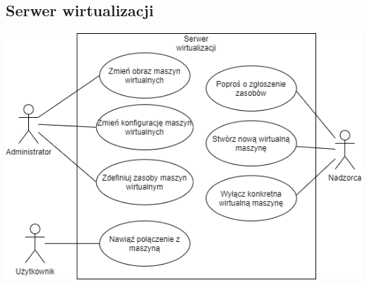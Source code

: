 \documentclass[12pt]{article}
\begin{document}
\subsection{Serwer wirtualizacji}
\includegraphics[width=\textwidth]{../diagrams/use_cases/virtualisation_server.png}
\end{document}
